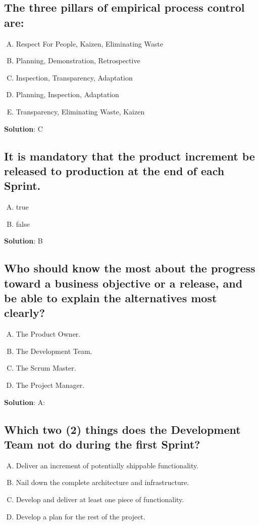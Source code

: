 \subsection{The three pillars of empirical process control are:}
\begin{enumerate}[A)]
  \item Respect For People, Kaizen, Eliminating Waste
  \item Planning, Demonstration, Retrospective
  \item Inspection, Transparency, Adaptation
  \item Planning, Inspection, Adaptation
  \item Transparency, Eliminating Waste, Kaizen
\end{enumerate}


\textbf{Solution}: C


\subsection{It is mandatory that the product increment be released to production at the end of each Sprint.}
\begin{enumerate}[A)]
  \item true
  \item false
\end{enumerate}


\textbf{Solution}: B


\subsection{Who should know the most about the progress toward a business objective or a
  release, and be able to explain the alternatives most clearly?}
\begin{enumerate}[A)]
  \item The Product Owner.
  \item The Development Team.
  \item The Scrum Master.
  \item The Project Manager.
\end{enumerate}


\textbf{Solution}: A:


\subsection{Which two (2) things does the Development Team not do during the first Sprint?}
\begin{enumerate}[A)]
  \item Deliver an increment of potentially shippable functionality.
  \item Nail down the complete architecture and infrastructure.
  \item Develop and deliver at least one piece of functionality.
  \item Develop a plan for the rest of the project.
\end{enumerate}


